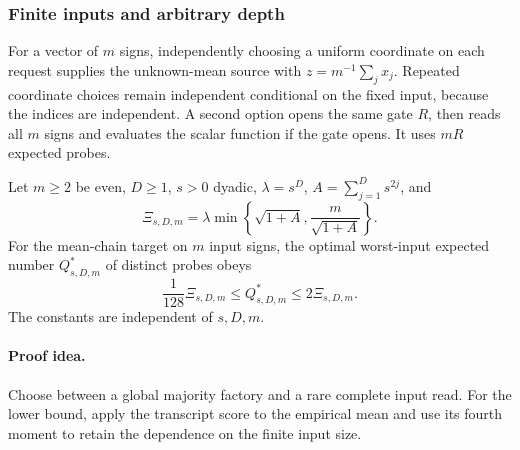 \subsubsection{Finite inputs and arbitrary depth}

For a vector of \(m\) signs, independently choosing a uniform
coordinate on each request supplies the unknown-mean source with
\(z=m^{-1}\sum_jx_j\). Repeated coordinate choices remain independent
conditional on the fixed input, because the indices are independent.
A second option opens the same gate \(R\), then reads all \(m\)
signs and evaluates the scalar function if the gate opens.
It uses \(mR\) expected probes.

\begin{theorem}\label{thm:finitejoint}
Let \(m\ge2\) be even, \(D\ge1\), \(s>0\) dyadic,
\(\lambda=s^D\), \(A=\sum_{j=1}^D s^{2j}\), and
\[
\Xi_{s,D,m}=\lambda\min\left\{\sqrt{1+A},
                      \frac{m}{\sqrt{1+A}}\right\}.
\]
For the mean-chain target on \(m\) input signs, the optimal
worst-input expected number \(Q^*_{s,D,m}\) of distinct probes obeys
\begin{equation}\label{eq:finitejoint}
\frac1{128}\Xi_{s,D,m}\le Q^*_{s,D,m}\le2\Xi_{s,D,m}.
\end{equation}
The constants are independent of \(s,D,m\).
\end{theorem}
\paragraph{Proof idea.}
Choose between a global majority factory and a rare complete input read. For
the lower bound, apply the transcript score to the empirical mean and use
its fourth moment to retain the dependence on the finite input size.

